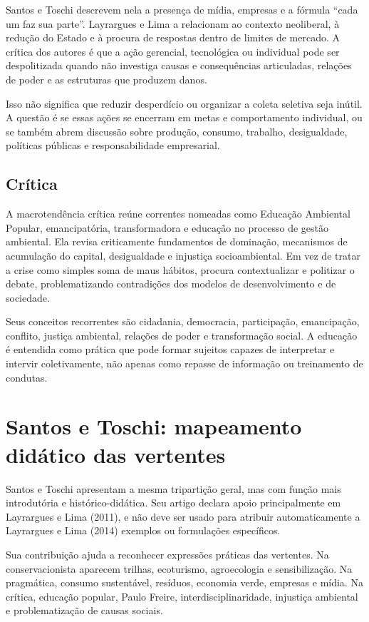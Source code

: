 \documentclass[12pt,a4paper]{article}
\begin{document}
Santos e Toschi descrevem nela a presença de mídia, empresas e a fórmula ``cada um faz sua parte''. Layrargues e Lima a relacionam ao contexto neoliberal, à redução do Estado e à procura de respostas dentro de limites de mercado. A crítica dos autores é que a ação gerencial, tecnológica ou individual pode ser despolitizada quando não investiga causas e consequências articuladas, relações de poder e as estruturas que produzem danos.

Isso não significa que reduzir desperdício ou organizar a coleta seletiva seja inútil. A questão é se essas ações se encerram em metas e comportamento individual, ou se também abrem discussão sobre produção, consumo, trabalho, desigualdade, políticas públicas e responsabilidade empresarial.

\subsection{Crítica}

A macrotendência crítica reúne correntes nomeadas como Educação Ambiental Popular, emancipatória, transformadora e educação no processo de gestão ambiental. Ela revisa criticamente fundamentos de dominação, mecanismos de acumulação do capital, desigualdade e injustiça socioambiental. Em vez de tratar a crise como simples soma de maus hábitos, procura contextualizar e politizar o debate, problematizando contradições dos modelos de desenvolvimento e de sociedade.

Seus conceitos recorrentes são cidadania, democracia, participação, emancipação, conflito, justiça ambiental, relações de poder e transformação social. A educação é entendida como prática que pode formar sujeitos capazes de interpretar e intervir coletivamente, não apenas como repasse de informação ou treinamento de condutas.

\section{Santos e Toschi: mapeamento didático das vertentes}

Santos e Toschi apresentam a mesma tripartição geral, mas com função mais introdutória e histórico-didática. Seu artigo declara apoio principalmente em Layrargues e Lima (2011), e não deve ser usado para atribuir automaticamente a Layrargues e Lima (2014) exemplos ou formulações específicos.

Sua contribuição ajuda a reconhecer expressões práticas das vertentes. Na conservacionista aparecem trilhas, ecoturismo, agroecologia e sensibilização. Na pragmática, consumo sustentável, resíduos, economia verde, empresas e mídia. Na crítica, educação popular, Paulo Freire, interdisciplinaridade, injustiça ambiental e problematização de causas sociais.
\end{document}
